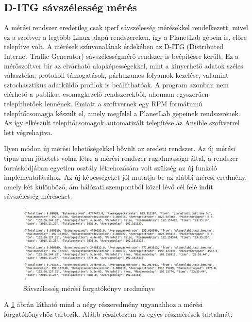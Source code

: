 \subsection*{D-ITG sávszélesség mérés}
A mérési rendszer eredetileg csak iperf sávszélesség mérésekkel rendelkezett, mivel ez a szoftver a legtöbb Linux alapú rendszereken, így a PlanetLab gépein is, előre telepítve volt. A mérések színvonalának érdekében az D-ITG (Distributed Internet Traffic Generator) sávszélességmérő rendszer is beépítésre került. Ez a mérőszoftver bír az elvárható alapképességekkel, mint a kinyerhető adatok széles választéka, protokoll támogatások, párhuzamos folyamok kezelése, valamint sztochasztikus adatküldő profilok is beállíthatóak. A program azonban nem elérhető a publikus csomagkezelő rendszerekből, ahonnan egyszerűen telepíthetőek lennének. Emiatt a szoftvernek egy RPM formátumú telepítőcsomagja készült el, amely megfelel a PlanetLab gépeinek rendszerének. 
Az így elkészült telepítőcsomagok automatizált telepítése az Ansible szoftverrel lett végrehajtva.

Ilyen módon új mérési lehetőségekkel bővült az eredeti rendszer. Az új mérési típus nem jöhetett volna létre a mérési rendszer rugalmassága által, a rendszer forráskódjában egyetlen osztály létrehozására volt szükség az új funkció implementálásához. Az új képességeket jól mutatja be az alábbi mérési eredmény, amely két különböző, ám hálózati szempontból közel lévő cél felé indít sávszélesség méréseket. 

\begin{figure}[!ht]
	\centering
	\includegraphics[width=0.95\textwidth, keepaspectratio]{figures/d-itg-measure.PNG}
	\caption{Sávszélesség mérési forgatókönyv eredménye}
	\label{fig:d-itg-measure}
\end{figure}

\newpage

A \ref{fig:d-itg-measure} ábrán látható mind a négy részeredmény ugyanahhoz a mérési forgatókönyvhöz tartozik. Alább részletezem az egyes részmérések tartalmát:


